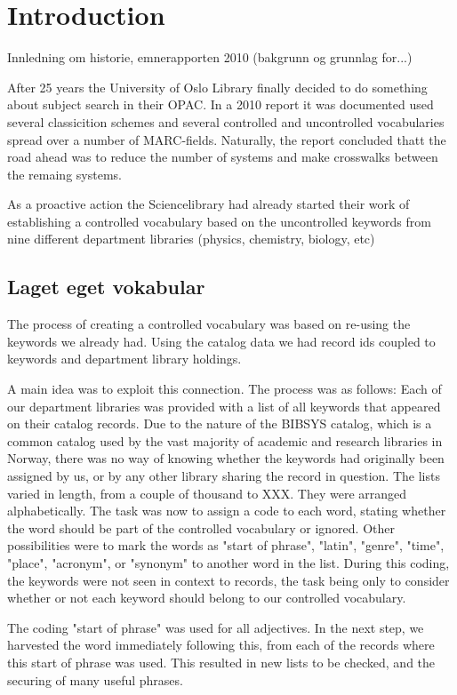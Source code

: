 \section{Introduction}

Innledning om historie, emnerapporten 2010 (bakgrunn og grunnlag for...)

After 25 years the University of Oslo  Library finally decided to do something about subject search in their OPAC. In a 2010 report it was documented  used several classicition schemes and several controlled and uncontrolled vocabularies spread over a number of MARC-fields. Naturally, the report concluded thatt the  road ahead  was to reduce the number of systems and make crosswalks between the remaing systems.

As a proactive action the Sciencelibrary had already started their work of establishing a  controlled vocabulary based on the uncontrolled keywords from nine different  department libraries (physics, chemistry, biology, etc)

\subsection{Laget eget vokabular}

The process of creating a controlled vocabulary was based on re-using the keywords we already had. Using the catalog data we had record ids coupled to keywords and department library holdings. 

A main idea was to exploit this connection. The process was as follows: Each of our department libraries was provided with a list of all keywords that appeared on their catalog records. Due to the nature of the BIBSYS catalog, which is a common catalog used by the vast majority of academic and research libraries in Norway, there was no way of knowing whether the keywords had originally been assigned by us, or by any other library sharing the record in question. The lists varied in length, from a couple of thousand to XXX. They were arranged alphabetically. The task was now to assign a code to each word, stating whether the word should be part of the controlled vocabulary or ignored. Other possibilities were to mark the words as "start of phrase", "latin", "genre", "time", "place", "acronym", or "synonym" to another word in the list. During this coding, the keywords were not seen in context to records, the task being only to consider whether or not each keyword should belong to our controlled vocabulary. 

The coding "start of phrase" was used for all adjectives. In the next step, we harvested the word immediately following this, from each of the records where this start of phrase was used. This resulted in new lists to be checked, and the securing of many useful phrases. 

